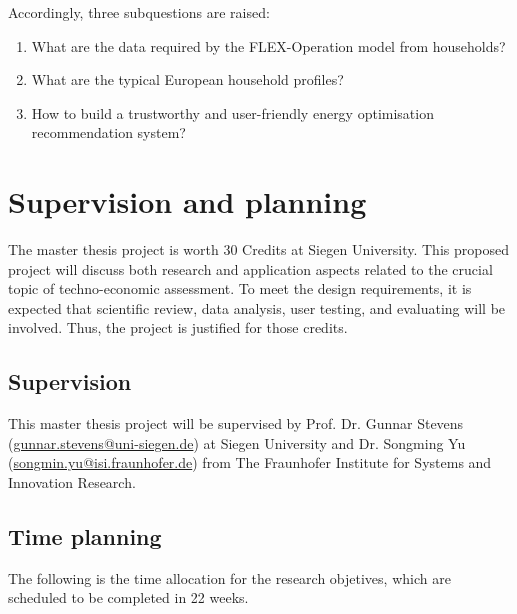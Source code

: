 Accordingly, three subquestions are raised: 

\begin{enumerate}
  \item What are the data required by the FLEX-Operation model from households? 
  \item What are the typical European household profiles? 
  \item How to build a trustworthy and user-friendly energy optimisation recommendation system? 
\end{enumerate}




\section{Supervision and planning} 




The master thesis project is worth 30 Credits at Siegen University. 
This proposed project will discuss both research and application aspects 
related to the crucial topic of techno-economic assessment. 
To meet the design requirements, 
it is expected that scientific review, data analysis, user testing, and evaluating will be involved. 
Thus, the project is justified for those credits.


\subsection{Supervision}


This master thesis project will be supervised by 
Prof. Dr. Gunnar Stevens (\href{mailto:gunnar.stevens@uni-siegen.de}{gunnar.stevens@uni-siegen.de}) at Siegen University and 
Dr. Songming Yu (\href{mailto:songmin.yu@isi.fraunhofer.de}{songmin.yu@isi.fraunhofer.de}) from The Fraunhofer Institute for Systems and Innovation Research. 


\subsection{Time planning}


The following is the time allocation for the research objetives, 
which are scheduled to be completed in 22 weeks. \\

